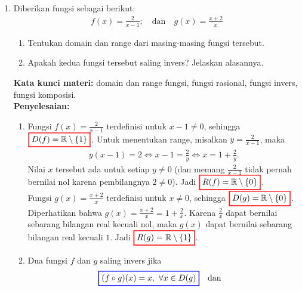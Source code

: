 \documentclass[10pt,openany,a4paper]{article}
\theoremstyle{definition}
\theoremstyle{definition}
\theoremstyle{plain}
\newenvironment{jawab}[2][tes]{%
\par\noindent\textbf{Kata kunci materi:} #1.\\
\textbf{Penyelesaian:} #2%
}{}
\begin{document}
\begin{enumerate}
    \item Diberikan fungsi sebagai berikut:
    \begin{align*}
        f(x)=\frac{2}{x-1};\quad \text{dan}\quad g(x)=\frac{x+2}{x}
    \end{align*}
    \begin{enumerate}
        \item Tentukan domain dan range dari masing-masing fungsi tersebut.
        \item Apakah kedua fungsi tersebut saling invers? Jelaskan alasannya.
    \end{enumerate}
    \begin{jawab}[domain dan range fungsi, fungsi rasional, fungsi invers, fungsi komposisi]{
        \begin{enumerate}
            \item Fungsi $f(x)=\frac{2}{x-1}$ terdefinisi untuk $x-1\neq 0$, sehingga $\colorlet{oldcolor}{.}
        \color{red}
        \setlength{\fboxrule}{1pt} \boxed{\color{oldcolor}D(f)=\mathbb{R}\setminus\{1\}}\color{oldcolor}$. Untuk menentukan range, misalkan $y=\frac{2}{x-1}$, maka
            \begin{align*}
                y(x-1) = 2 \iff x - 1 = \frac{2}{y} \iff x = 1+\frac{2}{y}.
            \end{align*}
            Nilai $x$ tersebut ada untuk setiap $y\neq 0$ (dan memang $\frac{2}{x-1}$ tidak pernah bernilai nol karena pembilangnya $2\neq 0$). Jadi $\colorlet{oldcolor}{.}
        \color{red}
        \setlength{\fboxrule}{1pt} \boxed{\color{oldcolor}R(f)=\mathbb{R}\setminus\{0\}}\color{oldcolor}$.\\
            Fungsi $g(x)=\frac{x+2}{x}$ terdefinisi untuk $x\neq 0$, sehingga $\colorlet{oldcolor}{.}
        \color{red}
        \setlength{\fboxrule}{1pt} \boxed{\color{oldcolor}D(g)=\mathbb{R}\setminus\{0\}}\color{oldcolor}$. Diperhatikan bahwa $g(x)=\frac{x+2}{x}=1+\frac{2}{x}$. Karena $\frac{2}{x}$ dapat bernilai sebarang bilangan real kecuali nol, maka $g(x)$ dapat bernilai sebarang bilangan real kecuali $1$. Jadi $\colorlet{oldcolor}{.}
        \color{red}
        \setlength{\fboxrule}{1pt} \boxed{\color{oldcolor}R(g)=\mathbb{R}\setminus\{1\}}\color{oldcolor}$.
            \item Dua fungsi $f$ dan $g$ saling invers jika
            \begin{align*}
                \colorlet{oldcolor}{.}
        \color{blue}
        \setlength{\fboxrule}{1pt} \boxed{\color{oldcolor}(f\circ g)(x)=x,~\forall x\in D(g)}\color{oldcolor} \quad\text{dan}\quad \colorlet{oldcolor}{.}

\end{align*}
\end{enumerate}}
\end{jawab}
\end{enumerate}
\end{document}

